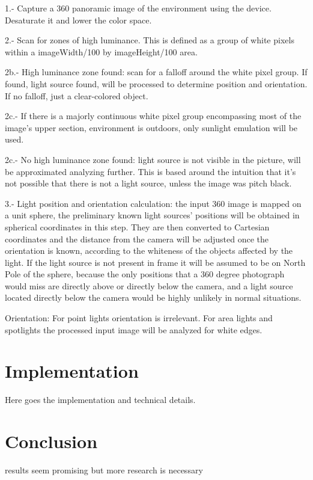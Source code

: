 \documentclass{article}
\begin{document}
1.- Capture a 360 panoramic image of the environment using the device. Desaturate it and lower the color space.

2.- Scan for zones of high luminance. This is defined as a group of white pixels within a imageWidth/100 by imageHeight/100 area.

2b.- High luminance zone found: scan for a falloff around the white pixel group. If found, light source found, will be processed to determine position and orientation. If no falloff, just a clear-colored object.

2c.- If there is a majorly continuous white pixel group encompassing most of the image's upper section, environment is outdoors, only sunlight emulation will be used.

2c.- No high luminance zone found: light source is not visible in the picture, will be approximated analyzing further. This is based around the intuition that it's not possible that there is not a light source, unless the image was pitch black.

3.- Light position and orientation calculation: the input 360 image is mapped on a unit sphere, the preliminary known light sources' positions will be obtained in spherical coordinates in this step. They are then converted to Cartesian coordinates and the distance from the camera will be adjusted once the orientation is known, according to the whiteness of the objects affected by the light. If the light source is not present in frame it will be assumed to be on North Pole of the sphere, because the only positions that a 360 degree photograph would miss are directly above or directly below the camera, and a light source located directly below the camera would be highly unlikely in normal situations.

Orientation: For point lights orientation is irrelevant. For area lights and spotlights the processed input image will be analyzed for white edges.


\section{Implementation}
Here goes the implementation and technical details.

\section{Conclusion}
results seem promising but more research is necessary



\end{document}

